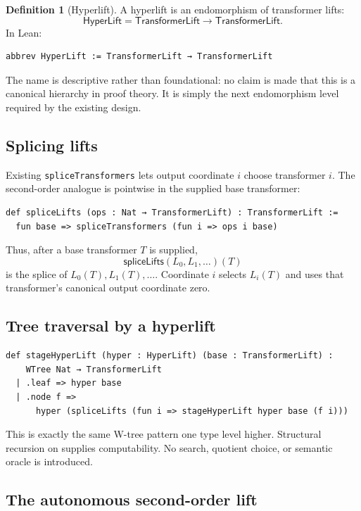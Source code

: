 \documentclass[11pt]{article}
\theoremstyle{definition}
\newtheorem{definition}[theorem]{Definition}
\theoremstyle{remark}
\newcommand{\lean}[1]{\nolinkurl{#1}}
\newcommand{\leancode}[1]{\texttt{\detokenize{#1}}}
\newcommand{\TL}{\mathsf{TransformerLift}}
\newcommand{\HL}{\mathsf{HyperLift}}
\begin{document}
\begin{definition}[Hyperlift]
A hyperlift is an endomorphism of transformer lifts:
\[
  \HL = \TL\to\TL.
\]
In Lean:
\begin{lstlisting}
abbrev HyperLift := TransformerLift → TransformerLift
\end{lstlisting}
\end{definition}

The name is descriptive rather than foundational: no claim is made that this
is a canonical hierarchy in proof theory. It is simply the next endomorphism
level required by the existing design.

\subsection{Splicing lifts}

Existing \lean{spliceTransformers} lets output coordinate $i$ choose transformer
$i$. The second-order analogue is pointwise in the supplied base transformer:

\begin{lstlisting}
def spliceLifts (ops : Nat → TransformerLift) : TransformerLift :=
  fun base => spliceTransformers (fun i => ops i base)
\end{lstlisting}

Thus, after a base transformer $T$ is supplied,
\[
  \mathsf{spliceLifts}(L_0,L_1,\ldots)(T)
\]
is the splice of $L_0(T),L_1(T),\ldots$. Coordinate $i$ selects $L_i(T)$ and
uses that transformer's canonical output coordinate zero.

\subsection{Tree traversal by a hyperlift}

\begin{lstlisting}
def stageHyperLift (hyper : HyperLift) (base : TransformerLift) :
    WTree Nat → TransformerLift
  | .leaf => hyper base
  | .node f =>
      hyper (spliceLifts (fun i => stageHyperLift hyper base (f i)))
\end{lstlisting}

This is exactly the same W-tree pattern one type level higher. Structural
recursion on \leancode{WTree Nat} supplies computability. No search, quotient
choice, or semantic oracle is introduced.

\subsection{The autonomous second-order lift}
\end{document}
